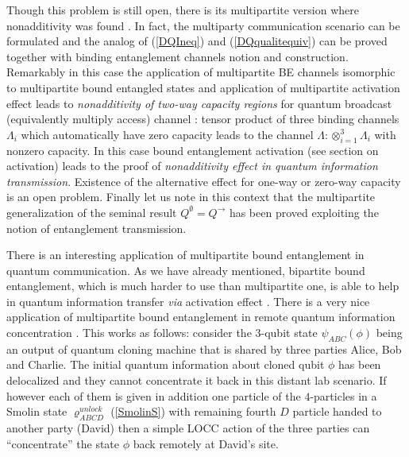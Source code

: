 \documentclass[twocolumn,aps,rmp]{revtex4}
\begin{document}
Though this problem is still  open, there is its multipartite
version where nonadditivity was found \cite{DuHoCi04}. In fact, the
multiparty communication scenario can be formulated and the analog
of (\ref{DQIneq}) and (\ref{DQqualitequiv}) can be proved
\cite{DuHoCi04} together with binding entanglement channels notion
and construction. Remarkably in this case the application of
multipartite BE channels isomorphic to multipartite bound entangled
states and application of multipartite activation effect leads to
{\it nonadditivity of two-way capacity regions} for quantum
broadcast (equivalently multiply access) channel \cite{DuHoCi04}:
tensor product of three binding channels $\Lambda_{i}$ which
automatically have zero capacity leads to the channel
$\Lambda:\otimes_{i=1}^{3}\Lambda_{i}$ with nonzero capacity. In
this case bound entanglement activation (see section on activation)
leads to the proof of {\it nonadditivity effect in quantum
information transmission}. Existence of the alternative effect for
one-way or zero-way capacity is an open problem.
Finally let us note in this context that the multipartite
generalization of the seminal result $Q^{ \emptyset
}=Q^{\rightarrow}$ has been proved  \cite{DemianowiczZero-Way} exploiting the notion  of entanglement transmission.

There is an interesting application of multipartite bound
entanglement in quantum communication. As we have already mentioned,
bipartite bound entanglement, which is much harder to use than
multipartite one, is able to help in quantum information transfer
{\it via} activation effect \cite{activation}. There is a very nice
application of multipartite bound entanglement in remote quantum
information concentration \cite{MuraoV1999-concentration}. This
works as follows: consider  the 3-qubit state $\psi_{ABC}(\phi)$
being an output of quantum cloning machine
that is shared by three parties Alice, Bob and
Charlie. The initial quantum information about cloned qubit $\phi$
 has been delocalized and they cannot concentrate it back
 in this distant lab scenario. If however each of them is given in addition one
particle of the $4$-particles in a Smolin state
$\varrho^{unlock}_{ABCD}$ (\ref{SmolinS}) with remaining fourth $D$
particle handed to another party (David) then a simple LOCC action of
the three parties can ``concentrate'' the state $\phi$ back remotely
at David's site.
\end{document}
